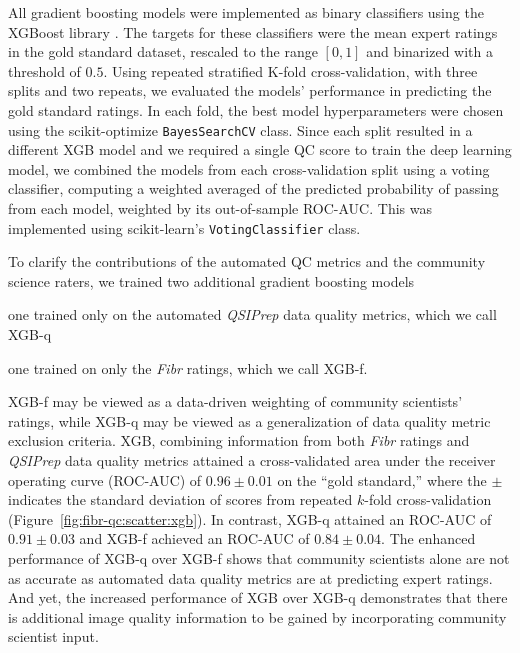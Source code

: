 \documentclass[fleqn,10pt,inline]{wlscirep}
\begin{document}
All gradient boosting models were implemented as binary classifiers using the XGBoost library
\cite{xgboost}. The targets for these classifiers were the mean expert ratings
in the gold standard dataset, rescaled to the range $[0, 1]$ and binarized with
a threshold of $0.5$. Using repeated
stratified K-fold cross-validation, with three splits and two repeats, we
evaluated the models' performance in predicting the gold standard ratings. In
each fold, the best model hyperparameters were chosen using the scikit-optimize
\cite{scikit-optimize} \texttt{BayesSearchCV} class. 
Since each split resulted in a different XGB model and we required a single QC score
to train the deep learning model, we combined the models from each
cross-validation split using a voting classifier, computing a weighted averaged
of the predicted probability of passing from each model, weighted by its
out-of-sample ROC-AUC. This was implemented using scikit-learn's
\texttt{VotingClassifier} class.

To clarify the contributions of the automated QC metrics and the community
science raters, we trained two additional gradient boosting models
\begin{enumerate*}[%
    label=(\roman*),%
    before=\unskip{: },%
    itemjoin={{, }},%
    itemjoin*={{ and }}]
    \item one trained only on the automated \emph{QSIPrep} data quality metrics, which we
    call XGB-q
    \item one trained on only the \emph{Fibr} ratings, which we call XGB-f.
\end{enumerate*}
XGB-f may be viewed as a data-driven weighting of community scientists' ratings,
while XGB-q may be viewed as a generalization of data quality metric exclusion criteria.
XGB, combining information from both \emph{Fibr} ratings and \emph{QSIPrep} data quality
metrics attained a cross-validated area under the receiver operating curve
(ROC-AUC) of $0.96 \pm 0.01$ on the ``gold standard,'' where the $\pm$ indicates
the standard deviation of scores from repeated $k$-fold cross-validation
(Figure~\ref{fig:fibr-qc:scatter:xgb}). In contrast, XGB-q attained an ROC-AUC of
$0.91 \pm 0.03$ and XGB-f achieved an ROC-AUC of $0.84 \pm 0.04$.
The enhanced
performance of XGB-q over XGB-f shows that community scientists alone are not as
accurate as automated data quality metrics are at predicting expert ratings. And yet, the
increased performance of XGB over XGB-q demonstrates that there is additional
image quality information to be gained by incorporating community scientist input.
\end{document}
